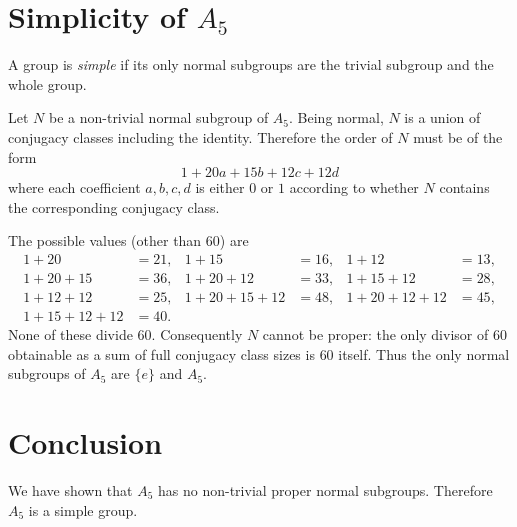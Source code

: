 \documentclass{article}
\begin{document}
\section{Simplicity of $A_5$}
A group is \emph{simple} if its only normal subgroups are the trivial subgroup and the whole group.

Let $N$ be a non-trivial normal subgroup of $A_5$.  Being normal, $N$ is a union of conjugacy classes including the identity.  Therefore the order of $N$ must be of the form
\[
1 + 20a + 15b + 12c + 12d
\]
where each coefficient $a,b,c,d$ is either $0$ or $1$ according to whether $N$ contains the corresponding conjugacy class.

The possible values (other than $60$) are
\begin{align*}
1+20 &=21, &1+15&=16, &1+12&=13,\\
1+20+15&=36, &1+20+12&=33, &1+15+12&=28,\\
1+12+12&=25, &1+20+15+12&=48, &1+20+12+12&=45,\\
1+15+12+12&=40.
\end{align*}
None of these divide $60$.  Consequently $N$ cannot be proper: the only divisor of $60$ obtainable as a sum of full conjugacy class sizes is $60$ itself.  Thus the only normal subgroups of $A_5$ are $\{e\}$ and $A_5$.

\section{Conclusion}
We have shown that $A_5$ has no non-trivial proper normal subgroups. Therefore $A_5$ is a simple group.
\end{document}
